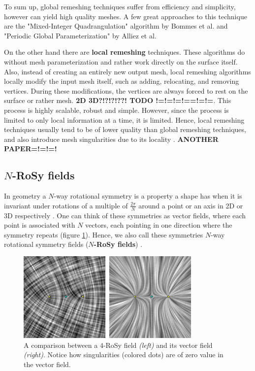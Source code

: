 \documentclass{ACGSeminar}
\begin{document}
To sum up, global remeshing techniques suffer from efficiency and simplicity, however can yield high quality meshes. A few great approaches to this technique are the "Mixed-Integer Quadrangulation" algorithm by Bommes et al. and "Periodic Global Parameterization" by Alliez et al.\bigskip

On the other hand there are \textbf{local remeshing} techniques. These algorithms do without mesh parameterization and rather work directly on the surface itself. Also, instead of creating an entirely new output mesh, local remeshing algorithms locally modify the input mesh itself, such as adding, relocating, and removing vertices. During these modifications, the vertices are always forced to rest on the surface or rather mesh. \textbf{2D 3D?!?!?!??! TODO !=!=!=!==!=!=}. This process is highly scalable, robust and simple. However, since the process is limited to only local information at a time, it is limited. Hence, local remeshing techniques usually tend to be of lower quality than global remeshing techniques, and also introduce mesh singularities due to its locality \cite{jakob2015instant,alliez2008recent}. \textbf{ANOTHER PAPER=!=!=!}


\subsection{$N$-RoSy fields}\label{rosy}
In geometry a $N$-way rotational symmetry is a property a shape has when it is invariant under rotations of a multiple of $\frac{2\pi}{N}$ around a point or an axis in 2D or 3D respectively \cite{palacios2007rotational}. One can think of these symmetries as vector fields, where each point is associated with $N$ vectors, each pointing in one direction where the symmetry repeats (figure \ref{fig:n-rosy-singularities}). Hence, we also call these symmetries $N$-way rotational symmetry fields (\textbf{$N$-RoSy fields}) \cite{panozzo2012fields}.

\begin{figure}[htb!]
	\begin{centering}
		\includegraphics[width=9cm]{img/n-Rosy-Singularity.png}\par
	\end{centering}
	\caption{A comparison between a $4$-RoSy field \textit{(left)} and its vector field \textit{(right)}. Notice how singularities (colored dots) are of zero value in the vector field. \cite{palacios2007rotational}}
	\label{fig:n-rosy-singularities}
\end{figure}
\end{document}
